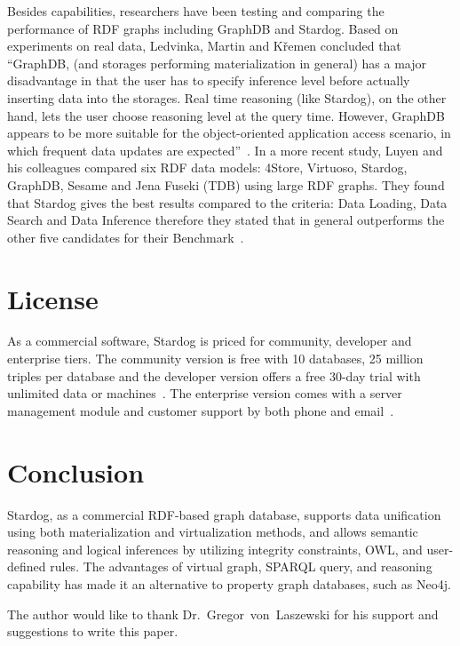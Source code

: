 Besides capabilities, researchers have been testing and comparing the 
performance of RDF graphs including GraphDB and Stardog. Based on 
experiments on real data, Ledvinka, Martin and K{\v{r}}emen concluded that 
``GraphDB, (and storages performing materialization in general) has a major 
disadvantage in that the user has to specify inference level before actually 
inserting data into the storages. Real time reasoning (like Stardog), on the 
other hand, lets the user choose reasoning level at the query time. However, 
GraphDB appears to be more suitable for the object-oriented application 
access scenario, in which frequent data updates are 
expected''~\cite{hid-sp18-405-ledvinka2015object-stardog}. In a more recent 
study, Luyen and his colleagues compared six RDF data models: 4Store, 
Virtuoso, Stardog, GraphDB, Sesame and Jena Fuseki (TDB) using large RDF 
graphs. They found that Stardog gives the best results compared to the 
criteria: Data Loading, Data Search and Data Inference therefore they stated 
that in general outperforms the other five candidates for their 
Benchmark~\cite{hid-sp18-405-luyen2016development-stardog}.


\section{License}
As a commercial software, Stardog is priced for community, developer and 
enterprise tiers. The community version is free with 10 databases, 25 million 
triples 
per database and the developer version offers a free 30-day trial with 
unlimited data or 
machines~\cite{hid-sp18-405-www-stardog-predictiveanalyticstoday}. The 
enterprise version comes with a server management module and customer 
support by both phone and email~\cite{hid-sp18-405-www-stardog-docs}.


\section{Conclusion}
Stardog, as a commercial RDF-based graph database, supports data 
unification using both materialization and virtualization methods, and allows 
semantic reasoning and logical inferences by utilizing integrity constraints, 
OWL, and user-defined rules. The advantages of virtual graph, SPARQL 
query, and reasoning capability has made it an alternative to property graph 
databases, such as Neo4j. 


\begin{acks}

  The author would like to thank Dr.~Gregor~von~Laszewski for his
  support and suggestions to write this paper.

\end{acks}


 

